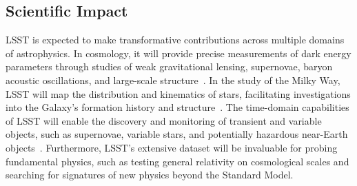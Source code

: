 \subsection{Scientific Impact}

LSST is expected to make transformative contributions across multiple domains of astrophysics. In cosmology, it will provide precise measurements of dark energy parameters through studies of weak gravitational lensing, supernovae, baryon acoustic oscillations, and large-scale structure~\cite{2012arXiv1211.0310L}. In the study of the Milky Way, LSST will map the distribution and kinematics of stars, facilitating investigations into the Galaxy's formation history and structure~\cite{2019NatRP...1..450R}. The time-domain capabilities of LSST will enable the discovery and monitoring of transient and variable objects, such as supernovae, variable stars, and potentially hazardous near-Earth objects~\cite{2018Icar..303..181J}. Furthermore, LSST's extensive dataset will be invaluable for probing fundamental physics, such as testing general relativity on cosmological scales and searching for signatures of new physics beyond the Standard Model.
